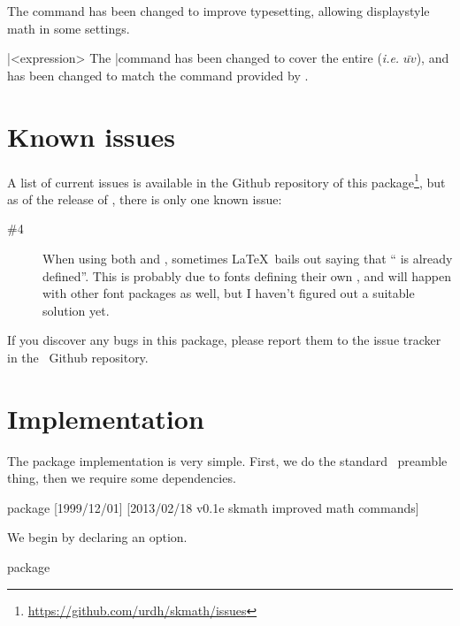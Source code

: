 \documentclass[commonsets,load]{skdoc}
\begin{document}
  \DescribeMacro{}
  The \Macro\frac command has been changed to improve typesetting,
  allowing displaystyle math in some settings.
 
  \DescribeMacro\bar{<expression>}
  \DescribeMacro{}
  The \Macro\bar command has been changed to cover the entire 
   (\emph{i.e.} \(\bar{uv}\)), and \Macro\vec has
  been changed to match the  command provided by 
  .

  \section{Known issues}
  A list of current issues is available in the Github repository of this
  package\footnote{\url{https://github.com/urdh/skmath/issues}}, but as
  of the release of \theversion, there is only one known issue:
  \begin{description}
      \item[\#4]  When using both  and \thepackage, sometimes
                  \LaTeX\ bails out saying that \enquote{ is already
                  defined}. This is probably due to fonts defining their own
                  , and will happen with other font packages as well,
                  but I haven't figured out a suitable solution yet.
  \end{description}
  If you discover any bugs in this package, please report them to the issue
  tracker in the \thepackage\ Github repository.

  \section{Implementation}
  The package implementation is very simple. First, we do the standard
  \LaTeXe\ preamble thing, then we require some dependencies.
\begin{MacroCode}{package}
[1999/12/01]
%
    [2013/02/18 v0.1e skmath improved math commands]
\RequirePackage{xparse}
\RequirePackage{kvoptions,amssymb,mathtools,xfrac,isomath}
\end{MacroCode}

  We begin by declaring an option.
\begin{MacroCode}{package}
\ProcessKeyvalOptions*
\end{MacroCode}
\end{document}
